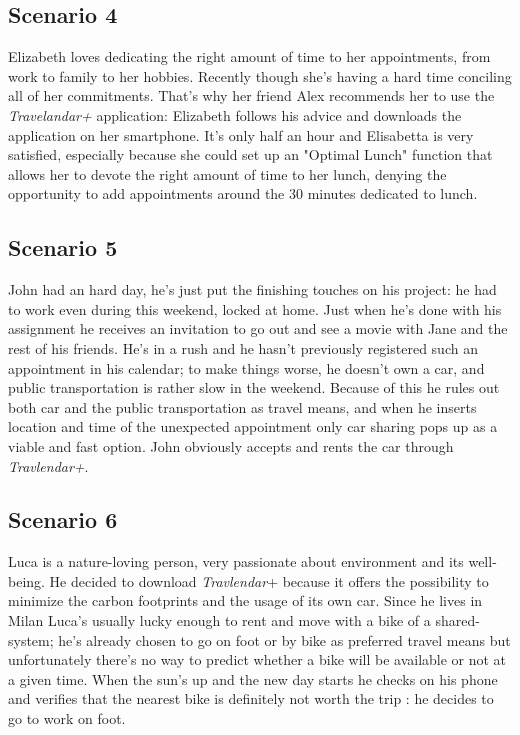 \subsection{Scenario 4}

Elizabeth loves dedicating the right amount of time to her appointments, from work to family to her hobbies. Recently though she’s having a hard time conciling all of her commitments.
That’s why her friend Alex recommends her to use the \textit{Travelandar+} application: Elizabeth follows his advice and downloads the application on her smartphone.
It’s only half an hour and Elisabetta is very satisfied, especially because she could set up an "Optimal Lunch" function that allows her to devote the right amount of time to her lunch, denying the opportunity to add appointments around the 30 minutes dedicated to lunch.

\subsection {Scenario 5}

John had an hard day, he’s just put the finishing touches on his project: he had to work even during this weekend, locked at home. Just when he’s done with his assignment he receives an invitation to go out and see a movie with Jane and the rest of his friends.
He’s in a rush and he hasn’t previously registered such an appointment in his calendar; to make things worse, he doesn’t own a car, and public transportation is rather slow in the weekend.
Because of this he rules out both car and the public transportation as travel means, and when he inserts location and time of the unexpected appointment only car sharing pops up as a viable and fast option.
John obviously accepts and rents the car through \textit{Travlendar+}.

\subsection {Scenario 6}

Luca is a nature-loving person, very passionate about environment and its well-being.
He decided to download \textit{Travlendar}+ because it offers the possibility to minimize the carbon footprints and the usage of its own car.
Since he lives in Milan Luca’s usually lucky enough to rent and move with a bike of a shared-system; he’s already chosen to go on foot or by bike as preferred travel means but unfortunately there’s no way to predict whether a bike will be available or not at a given time.
When the sun’s up and the new day starts he checks on his phone and verifies that the nearest bike is definitely not worth the trip : he decides to go to work on foot.


